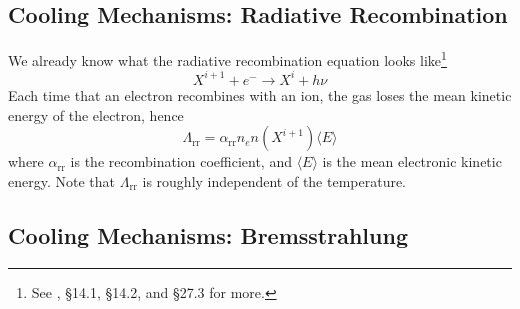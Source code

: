 \subsection{Cooling Mechanisms: Radiative Recombination}

We already know what the radiative recombination equation looks like\footnote{See \cite{2011piim.book.....D}, §14.1, §14.2, and §27.3 for more.} 
\begin{equation*}
    X^{i+1} + e^{-} \to X^{i} + h\nu
\end{equation*}
Each time that an electron recombines with an ion, the gas loses the mean kinetic energy of the electron, hence
\begin{equation}
    \Lambda_{\text{rr}} = \alpha_{\text{rr}}n_{e}n(X^{i+1})\langle E \rangle 
\end{equation}
where $\alpha_{\text{rr}}$ is the recombination coefficient, and $\langle E \rangle$ is the mean electronic kinetic energy. Note that $\Lambda_{\text{rr}}$ is roughly independent of the temperature.

\subsection{Cooling Mechanisms: Bremsstrahlung}

